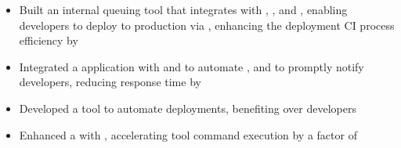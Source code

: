 {\begin{rSection}{}
 \href{https://www.wonolo.com/}{}  \hfill {}
\begin{itemize}
    \itemsep -4pt {} 
    \item Built an internal queuing tool that integrates with , , and , enabling developers to deploy to production via , enhancing the deployment CI process efficiency by 
    \item Integrated a  application with  and  to automate , and  to promptly notify developers, reducing response time by 
    \item Developed a  tool to automate  deployments, benefiting over  developers
    \item Enhanced a  with , accelerating tool command execution by a factor of 
\end{itemize}


\end{rSection}}
